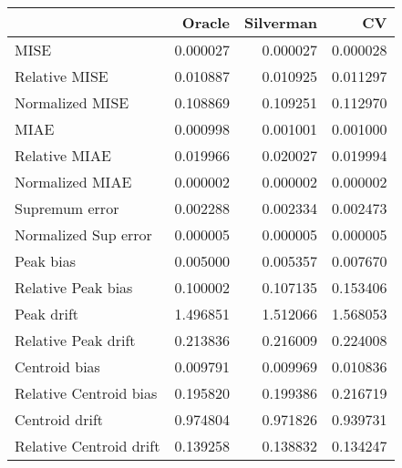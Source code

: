 \begin{tabular}{lrrr}
  \toprule
 & Oracle & Silverman & CV \\ 
  \midrule
MISE & 0.000027 & 0.000027 & 0.000028 \\ 
  Relative MISE & 0.010887 & 0.010925 & 0.011297 \\ 
  Normalized MISE & 0.108869 & 0.109251 & 0.112970 \\ 
  MIAE & 0.000998 & 0.001001 & 0.001000 \\ 
  Relative MIAE & 0.019966 & 0.020027 & 0.019994 \\ 
  Normalized MIAE & 0.000002 & 0.000002 & 0.000002 \\ 
  Supremum error & 0.002288 & 0.002334 & 0.002473 \\ 
  Normalized Sup error & 0.000005 & 0.000005 & 0.000005 \\ 
  Peak bias & 0.005000 & 0.005357 & 0.007670 \\ 
  Relative Peak bias & 0.100002 & 0.107135 & 0.153406 \\ 
  Peak drift & 1.496851 & 1.512066 & 1.568053 \\ 
  Relative Peak drift & 0.213836 & 0.216009 & 0.224008 \\ 
  Centroid bias & 0.009791 & 0.009969 & 0.010836 \\ 
  Relative Centroid bias & 0.195820 & 0.199386 & 0.216719 \\ 
  Centroid drift & 0.974804 & 0.971826 & 0.939731 \\ 
  Relative Centroid drift & 0.139258 & 0.138832 & 0.134247 \\ 
   \bottomrule
\end{tabular}
